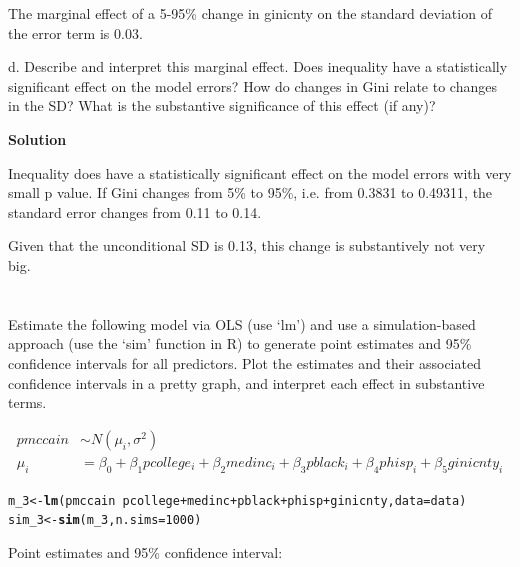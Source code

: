 \documentclass{article}\usepackage[]{graphicx}\usepackage[]{color}
\makeatletter
\newcommand{\hlnum}[1]{\textcolor[rgb]{0.686,0.059,0.569}{#1}}%
\newcommand{\hlopt}[1]{\textcolor[rgb]{0,0,0}{#1}}%
\newcommand{\hlstd}[1]{\textcolor[rgb]{0.345,0.345,0.345}{#1}}%
\newcommand{\hlkwb}[1]{\textcolor[rgb]{0.69,0.353,0.396}{#1}}%
\newcommand{\hlkwc}[1]{\textcolor[rgb]{0.333,0.667,0.333}{#1}}%
\newcommand{\hlkwd}[1]{\textcolor[rgb]{0.737,0.353,0.396}{\textbf{#1}}}%
\newenvironment{kframe}{%
 \def\at@end@of@kframe{}%
 \ifinner\ifhmode%
  \def\at@end@of@kframe{\end{minipage}}%
  \begin{minipage}{\columnwidth}%
 \fi\fi%
 \def\FrameCommand##1{\hskip\@totalleftmargin \hskip-\fboxsep
 \colorbox{shadecolor}{##1}\hskip-\fboxsep
     \hskip-\linewidth \hskip-\@totalleftmargin \hskip\columnwidth}%
 \MakeFramed {\advance\hsize-\width
   \@totalleftmargin\z@ \linewidth\hsize
   \@setminipage}}%
 {\par\unskip\endMakeFramed%
 \at@end@of@kframe}
\newenvironment{knitrout}{}{} %
\makeatother
\begin{document}
The marginal effect of a 5-95\% change in ginicnty on the standard deviation of the error term is 0.03.

d. Describe and interpret this marginal effect. Does inequality have a statistically significant effect on the model errors? How do changes in Gini relate to changes in the SD? What is the substantive significance of this effect (if any)?

\textbf{Solution}

Inequality does have a statistically significant effect on the model errors with very small p value. If Gini changes from 5\% to 95\%, i.e. from 0.3831 to 0.49311, the standard error changes from 0.11 to 0.14.

Given that the unconditional SD is 0.13, this change is substantively not very big.

\section{}

Estimate the following model via OLS (use ‘lm’) and use a simulation-based approach (use the ‘sim’ function in R) to generate point estimates and 95\% confidence intervals for all predictors. Plot the estimates and their associated confidence intervals in a pretty graph, and interpret each effect in substantive terms.

\begin{align}
pmccain &\sim N(\mu_i, \sigma^2) \\
\mu_i &= \beta_0 + \beta_1 pcollege_i + \beta_2 medinc_i + \beta_3 pblack_i + \beta_4 phisp_i + \beta_5 ginicnty_i
\end{align}

\begin{knitrout}
\color{fgcolor}\begin{kframe}
\begin{alltt}
\hlstd{m_3} \hlkwb{<-} \hlkwd{lm}\hlstd{(pmccain} \hlopt{~} \hlstd{pcollege} \hlopt{+} \hlstd{medinc} \hlopt{+} \hlstd{pblack} \hlopt{+} \hlstd{phisp} \hlopt{+} \hlstd{ginicnty,} \hlkwc{data} \hlstd{= data)}
\hlstd{sim_3} \hlkwb{<-} \hlkwd{sim}\hlstd{(m_3,} \hlkwc{n.sims} \hlstd{=} \hlnum{1000}\hlstd{)}
\end{alltt}
\end{kframe}
\end{knitrout}

Point estimates and 95\% confidence interval:
\end{document}
